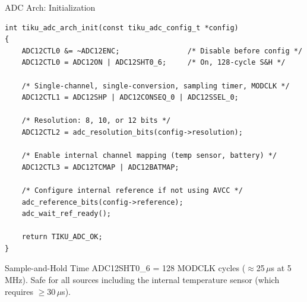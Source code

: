 \documentclass[aspectratio=169, 10pt]{beamer}
\begin{document}
\begin{frame}[fragile]{ADC Arch: Initialization}
\begin{lstlisting}[style=cstyle,
  title={arch/msp430/tiku\_adc\_arch.c --- tiku\_adc\_arch\_init()}]
int tiku_adc_arch_init(const tiku_adc_config_t *config)
{
    ADC12CTL0 &= ~ADC12ENC;                /* Disable before config */
    ADC12CTL0 = ADC12ON | ADC12SHT0_6;     /* On, 128-cycle S&H */

    /* Single-channel, single-conversion, sampling timer, MODCLK */
    ADC12CTL1 = ADC12SHP | ADC12CONSEQ_0 | ADC12SSEL_0;

    /* Resolution: 8, 10, or 12 bits */
    ADC12CTL2 = adc_resolution_bits(config->resolution);

    /* Enable internal channel mapping (temp sensor, battery) */
    ADC12CTL3 = ADC12TCMAP | ADC12BATMAP;

    /* Configure internal reference if not using AVCC */
    adc_reference_bits(config->reference);
    adc_wait_ref_ready();

    return TIKU_ADC_OK;
}
\end{lstlisting}

\vspace{0.3em}
\begin{block}{Sample-and-Hold Time}
ADC12SHT0\_6 = 128 MODCLK cycles ($\approx$25\,$\mu$s at 5\,MHz).
Safe for all sources including the internal temperature sensor
(which requires $\geq$30\,$\mu$s).
\end{block}
\end{frame}
\end{document}
